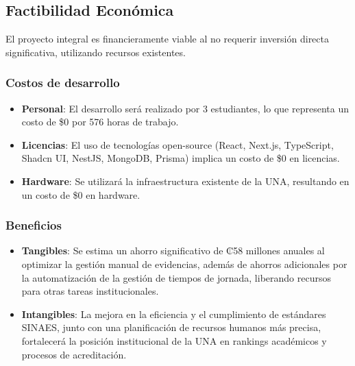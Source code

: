 \subsection{Factibilidad Económica}
El proyecto integral es financieramente viable al no requerir inversión directa significativa, utilizando recursos existentes.
\subsubsection{Costos de desarrollo}
\begin{itemize}
    \item \textbf{Personal}: El desarrollo será realizado por 3 estudiantes, lo que representa un costo de \$0 por 576 horas de trabajo.
    \item \textbf{Licencias}: El uso de tecnologías open-source (React, Next.js, TypeScript, Shadcn UI, NestJS, MongoDB, Prisma) implica un costo de \$0 en licencias.
    \item \textbf{Hardware}: Se utilizará la infraestructura existente de la UNA, resultando en un costo de \$0 en hardware.
\end{itemize}

\subsubsection{Beneficios}
\begin{itemize}
    \item \textbf{Tangibles}: Se estima un ahorro significativo de ₡58 millones anuales al optimizar la gestión manual de evidencias, además de ahorros adicionales por la automatización de la gestión de tiempos de jornada, liberando recursos para otras tareas institucionales.
    \item \textbf{Intangibles}: La mejora en la eficiencia y el cumplimiento de estándares SINAES, junto con una planificación de recursos humanos más precisa, fortalecerá la posición institucional de la UNA en rankings académicos y procesos de acreditación.
\end{itemize}

\newpage

